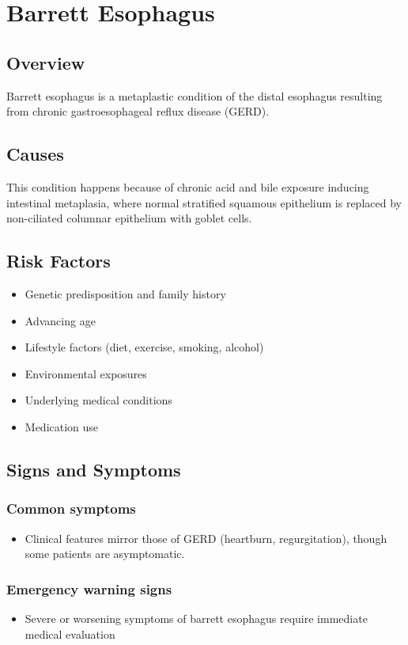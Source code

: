\chapter{Barrett Esophagus}
\label{sec:Barrett Esophagus}

\section{Overview}
Barrett esophagus is a metaplastic condition of the distal esophagus resulting from chronic gastroesophageal reflux disease (GERD).
\section{Causes}
This condition happens because of chronic acid and bile exposure inducing intestinal metaplasia, where normal stratified squamous epithelium is replaced by non-ciliated columnar epithelium with goblet cells.     
\section{Risk Factors}

\begin{itemize}[noitemsep]
  \item Genetic predisposition and family history
  \item Advancing age
  \item Lifestyle factors (diet, exercise, smoking, alcohol)
  \item Environmental exposures
  \item Underlying medical conditions
  \item Medication use
\end{itemize}
\section{Signs and Symptoms}

\subsection{Common symptoms}
\begin{itemize}[noitemsep]
  \item Clinical features mirror those of GERD (heartburn, regurgitation), though some patients are asymptomatic. 
  \end{itemize}

\subsection{Emergency warning signs}
\begin{itemize}[noitemsep]
  \item Severe or worsening symptoms of barrett esophagus require immediate medical evaluation
\end{itemize}
